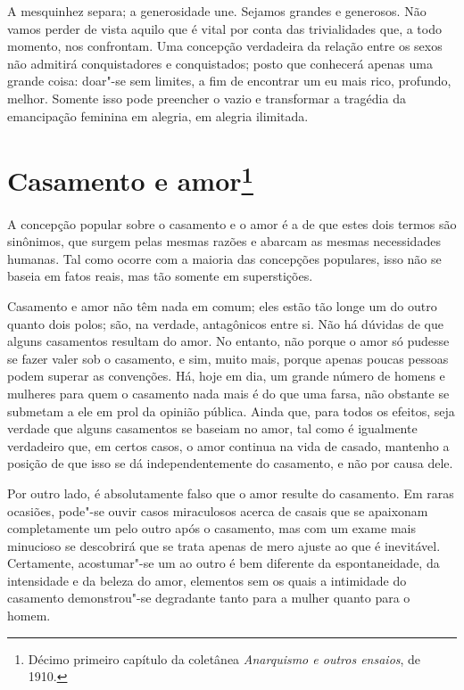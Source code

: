 A mesquinhez separa; a generosidade une. Sejamos grandes e generosos.
Não vamos perder de vista aquilo que é vital por conta das trivialidades
que, a todo momento, nos confrontam. Uma concepção verdadeira da relação\label{concepcao}
entre os sexos não admitirá conquistadores e conquistados; posto que
conhecerá apenas uma grande coisa: doar"-se sem limites, a fim de
encontrar um eu mais rico, profundo, melhor. Somente isso pode preencher
o vazio e transformar a tragédia da emancipação feminina em alegria, em
alegria ilimitada.

\chapter{Casamento e amor\footnote{Décimo primeiro capítulo da coletânea
  \emph{Anarquismo e outros ensaios}, de 1910.}}

A concepção popular sobre o casamento e o amor é a de que estes dois
termos são sinônimos, que surgem pelas mesmas razões e abarcam as mesmas
necessidades humanas. Tal como ocorre com a maioria das concepções
populares, isso não se baseia em fatos reais, mas tão somente em
superstições.

Casamento e amor não têm nada em comum; eles estão tão longe um do outro
quanto dois polos; são, na verdade, antagônicos entre si. Não há dúvidas
de que alguns casamentos resultam do amor. No entanto, não porque o
amor só pudesse se fazer valer sob o casamento, e sim, muito mais,
porque apenas poucas pessoas podem superar as convenções. Há, hoje em
dia, um grande número de homens e mulheres para quem o casamento nada
mais é do que uma farsa, não obstante se submetam a ele em prol da
opinião pública. Ainda que, para todos os efeitos, seja verdade que
alguns casamentos se baseiam no amor, tal como é igualmente verdadeiro
que, em certos casos, o amor continua na vida de casado, mantenho
a posição de que isso se dá independentemente do casamento, e
não por causa dele.

Por outro lado, é absolutamente falso que o amor resulte do casamento.
Em raras ocasiões, pode"-se ouvir casos miraculosos acerca de casais que
se apaixonam completamente um pelo outro após o casamento, mas com um
exame mais minucioso se descobrirá que se trata apenas de mero ajuste ao
que é inevitável. Certamente, acostumar"-se um ao outro é bem diferente
da espontaneidade, da intensidade e da beleza do amor, elementos sem os
quais a intimidade do casamento demonstrou"-se degradante tanto para a
mulher quanto para o homem.

